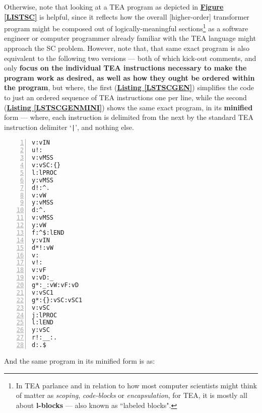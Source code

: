 \documentclass[12pt,a4paper]{article}
\begin{document}
Otherwise, note that looking at a TEA program as depicted in \textbf{\hyperref[LISTSC]{Figure \ref{LISTSC}}} is helpful, since it reflects how the overall [higher-order] transformer program might be composed out of logically-meaningful sections\footnote{In TEA parlance and in relation to how most computer scientists might think of matter as \textit{scoping}, \textit{code-blocks} or \textit{encapsulation}, for TEA, it is mostly all about \textbf{l-blocks} --- also known as ``labeled blocks"\cite{Lutalo2024TEATAZ}.} as a software engineer or computer programmer already familiar with the TEA language might approach the SC problem. However, note that, that same exact program is also equivalent to the following two versions --- both of which kick-out comments, and only \textbf{focus on the individual TEA instructions necessary to make the program work as desired, as well as how they ought be ordered within the program}, but where, the first (\textbf{\hyperref[LSTSCGEN]{Listing \ref{LSTSCGEN}}}) simplifies the code to just an ordered sequence of TEA instructions one per line, while the second (\textbf{\hyperref[LSTSCGEN]{Listing \ref{LSTSCGENMINI}}}) shows the same exact program, in its \textbf{minified} form --- where, each instruction is delimited from the next by the standard TEA instruction delimiter `\verb!|!', and nothing else.

 \small
  \begin{tcolorbox}[teaterminalstyle, title=TEA Program: SC-Generator, breakable]
  \begin{lstlisting}[language=TEA, caption={SC-Generator}, label={LSTSCGEN}, numbers=left]
v:vIN
u!:
v:vMSS
v:vSC:{}
l:lPROC
y:vMSS
d!:^.
v:vW
y:vMSS
d:^.
v:vMSS
y:vW
f:^$:lEND
y:vIN
d*!:vW
v:
v!:
v:vF
v:vD:_
g*:_:vW:vF:vD
v:vSC1
g*:{}:vSC:vSC1
v:vSC
j:lPROC
l:lEND
y:vSC
r!:__:.
d:.$
   \end{lstlisting}
  \end{tcolorbox}
  \vspace{1cm}


And the same program in its minified form is as:
\end{document}

